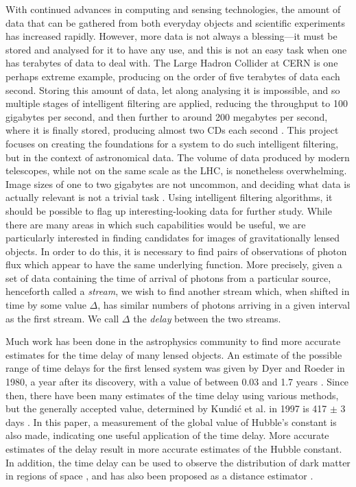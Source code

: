 \documentclass[a4paper,11pt]{article}
\begin{document}
With continued advances in computing and sensing technologies, the amount of
data that can be gathered from both everyday objects and scientific experiments
has increased rapidly. However, more data is not always a blessing---it must be
stored and analysed for it to have any use, and this is not an easy task when
one has terabytes of data to deal with. The Large Hadron Collider at CERN is one
perhaps extreme example, producing on the order of five terabytes of data each
second. Storing this amount of data, let along analysing it is impossible, and
so multiple stages of intelligent filtering are applied, reducing the throughput
to 100 gigabytes per second, and then further to around 200 megabytes per
second, where it is finally stored, producing almost two CDs each second
\cite{WLCGproc}. This project focuses on creating the foundations for a system
to do such intelligent filtering, but in the context of astronomical data. The
volume of data produced by modern telescopes, while not on the same scale as the
LHC, is nonetheless overwhelming. Image sizes of one to two gigabytes are not
uncommon, and deciding what data is actually relevant is not a trivial task
\cite{starck2002handbook}. Using intelligent filtering algorithms, it should be
possible to flag up interesting-looking data for further study. While there are
many areas in which such capabilities would be useful, we are particularly
interested in finding candidates for images of gravitationally lensed
objects. In order to do this, it is necessary to find pairs of observations of
photon flux which appear to have the same underlying function. More precisely,
given a set of data containing the time of arrival of photons from a particular
source, henceforth called a \emph{stream}, we wish to find another stream which,
when shifted in time by some value $\Delta$, has similar numbers of photons
arriving in a given interval as the first stream. We call $\Delta$ the
\emph{delay} between the two streams.

Much work has been done in the astrophysics community to find more accurate
estimates for the time delay of many lensed objects. An estimate of the possible
range of time delays for the first lensed system was given by Dyer and Roeder in
1980, a year after its discovery, with a value of between 0.03 and 1.7 years
\cite{dyer1980range}. Since then, there have been many estimates of the time
delay using various methods, but the generally accepted value, determined by
Kundi\'c et al. in 1997 is 417 $\pm$ 3 days \cite{kundic1997robust}. In this
paper, a measurement of the global value of Hubble's constant is also made,
indicating one useful application of the time delay. More accurate estimates of
the delay result in more accurate estimates of the Hubble constant. In addition,
the time delay can be used to observe the distribution of dark matter in regions
of space \cite{schneider2006gravitational}, and has also been proposed as a
distance estimator \cite{bozza2004time}.
\end{document}

